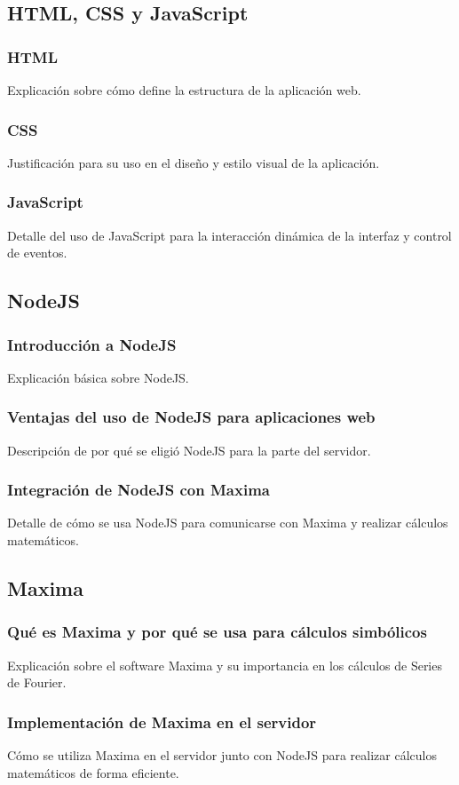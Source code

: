 \subsection{HTML, CSS y JavaScript}
\subsubsection{HTML}
Explicación sobre cómo define la estructura de la aplicación web.
\subsubsection{CSS}
Justificación para su uso en el diseño y estilo visual de la aplicación.
\subsubsection{JavaScript}
Detalle del uso de JavaScript para la interacción dinámica de la interfaz y control de eventos.

\subsection{NodeJS}
\subsubsection{Introducción a NodeJS}
Explicación básica sobre NodeJS.
\subsubsection{Ventajas del uso de NodeJS para aplicaciones web}
Descripción de por qué se eligió NodeJS para la parte del servidor.
\subsubsection{Integración de NodeJS con Maxima}
Detalle de cómo se usa NodeJS para comunicarse con Maxima y realizar cálculos matemáticos.

\subsection{Maxima}
\subsubsection{Qué es Maxima y por qué se usa para cálculos simbólicos}
Explicación sobre el software Maxima y su importancia en los cálculos de Series de Fourier.
\subsubsection{Implementación de Maxima en el servidor}
Cómo se utiliza Maxima en el servidor junto con NodeJS para realizar cálculos matemáticos de forma eficiente.

